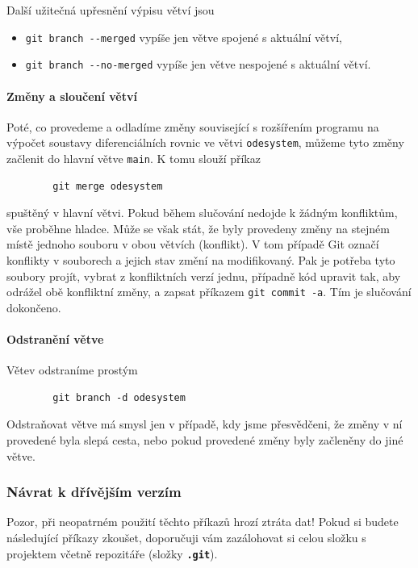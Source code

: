 \documentclass[a4paper,11pt,twoside]{article}
\newcommand{\subsubsubsection}[1]{\paragraph{#1}\mbox{}

}
\def\code#1{\textnormal{\texttt{#1}}}
\def\file#1{\textnormal{\textbf{\texttt{#1}}}}
\theoremstyle{red}
\theoremstyle{green}
\begin{document}
    Další užitečná upřesnění výpisu větví jsou
    \begin{itemize}
        \item \code{git branch -{}-merged} vypíše jen větve spojené s aktuální větví,
        \item \code{git branch -{}-no-merged} vypíše jen větve nespojené s aktuální větví.
    \end{itemize}

\subsubsubsection{Změny a sloučení větví}
    Poté, co provedeme a odladíme změny související s rozšířením programu na výpočet soustavy diferenciálních rovnic ve větvi \code{odesystem}, můžeme tyto změny začlenit do hlavní větve \code{main}.
    K tomu slouží příkaz
    \begin{lstlisting}
        git merge odesystem\end{lstlisting}
    spuštěný v hlavní větvi.
    Pokud během slučování nedojde k žádným konfliktům, vše proběhne hladce.
    Může se však stát, že byly provedeny změny na stejném místě jednoho souboru v obou větvích (konflikt).
    V tom případě Git označí konflikty v souborech a jejich stav změní na modifikovaný.
    Pak je potřeba tyto soubory projít, vybrat z konfliktních verzí jednu, případně kód upravit tak, aby odrážel obě konfliktní změny, a zapsat příkazem \code{git commit -a}.
    Tím je slučování dokončeno.    
    
\subsubsubsection{Odstranění větve}
    Větev odstraníme prostým
    \begin{lstlisting}
        git branch -d odesystem\end{lstlisting}
    Odstraňovat větve má smysl jen v případě, kdy jsme přesvědčeni, že změny v ní provedené byla slepá cesta, nebo pokud provedené změny byly začleněny do jiné větve.

\subsubsection{Návrat k dřívějším verzím}
    {\color{red} Pozor, při neopatrném použití těchto příkazů hrozí ztráta dat!}
    Pokud si budete následující příkazy zkoušet, doporučuji vám zazálohovat si celou složku s projektem včetně repozitáře (složky \file{.git}).
\end{document}
